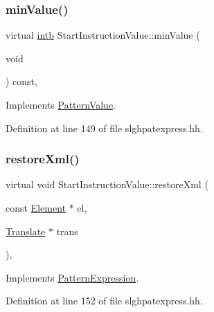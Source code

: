\subsubsection{\texorpdfstring{minValue()}{minValue()}}
{\footnotesize\ttfamily virtual \mbox{\hyperlink{types_8h_aa925ba3e627c2df89d5b1cfe84fb8572}{intb}} Start\+Instruction\+Value\+::min\+Value (\begin{DoxyParamCaption}\item[{void}]{ }\end{DoxyParamCaption}) const\hspace{0.3cm}{\ttfamily [inline]}, {\ttfamily [virtual]}}



Implements \mbox{\hyperlink{class_pattern_value_a0dbf85240fe6310e36596fea3bb02f2e}{Pattern\+Value}}.



Definition at line 149 of file slghpatexpress.\+hh.

\mbox{\label{class_start_instruction_value_a3b8738c1509a0e0ee7a373f3c4f22653}} 
\subsubsection{\texorpdfstring{restoreXml()}{restoreXml()}}
{\footnotesize\ttfamily virtual void Start\+Instruction\+Value\+::restore\+Xml (\begin{DoxyParamCaption}\item[{const \mbox{\hyperlink{class_element}{Element}} $\ast$}]{el,  }\item[{\mbox{\hyperlink{class_translate}{Translate}} $\ast$}]{trans }\end{DoxyParamCaption})\hspace{0.3cm}{\ttfamily [inline]}, {\ttfamily [virtual]}}



Implements \mbox{\hyperlink{class_pattern_expression_ad8986afdddbe7a8b64fdcf10478b5715}{Pattern\+Expression}}.



Definition at line 152 of file slghpatexpress.\+hh.

\mbox{\label{class_start_instruction_value_a4f78823c397837aff8eb30d41fa68149}} 
